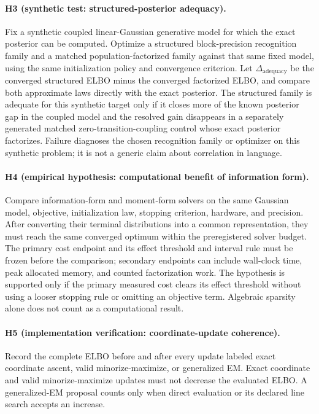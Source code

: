 \paragraph{H3 (synthetic test: structured-posterior adequacy).}
Fix a synthetic coupled linear-Gaussian generative model for which the exact posterior can be computed. Optimize a structured block-precision recognition family and a matched population-factorized family against that same fixed model, using the same initialization policy and convergence criterion. Let $\Delta_{\mathrm{adequacy}}$ be the converged structured ELBO minus the converged factorized ELBO, and compare both approximate laws directly with the exact posterior. The structured family is adequate for this synthetic target only if it closes more of the known posterior gap in the coupled model and the resolved gain disappears in a separately generated matched zero-transition-coupling control whose exact posterior factorizes. Failure diagnoses the chosen recognition family or optimizer on this synthetic problem; it is not a generic claim about correlation in language.

\paragraph{H4 (empirical hypothesis: computational benefit of information form).}
Compare information-form and moment-form solvers on the same Gaussian model, objective, initialization law, stopping criterion, hardware, and precision. After converting their terminal distributions into a common representation, they must reach the same converged optimum within the preregistered solver budget. The primary cost endpoint and its effect threshold and interval rule must be frozen before the comparison; secondary endpoints can include wall-clock time, peak allocated memory, and counted factorization work. The hypothesis is supported only if the primary measured cost clears its effect threshold without using a looser stopping rule or omitting an objective term. Algebraic sparsity alone does not count as a computational result.

\paragraph{H5 (implementation verification: coordinate-update coherence).}
Record the complete ELBO before and after every update labeled exact coordinate ascent, valid minorize-maximize, or generalized EM. Exact coordinate and valid minorize-maximize updates must not decrease the evaluated ELBO. A generalized-EM proposal counts only when direct evaluation or its declared line search accepts an increase.

